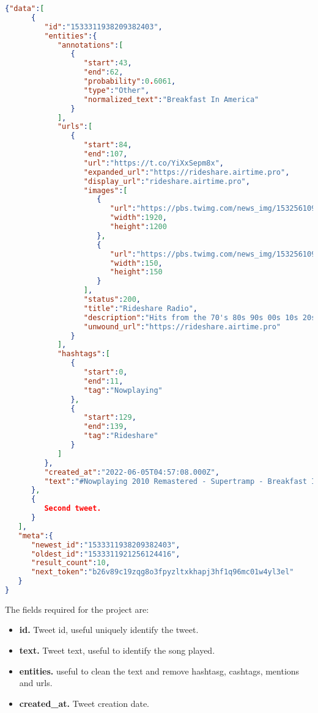 \begin{lstlisting}[language=json,firstnumber=1]
{"data":[
      {
         "id":"1533311938209382403",
         "entities":{
            "annotations":[
               {
                  "start":43,
                  "end":62,
                  "probability":0.6061,
                  "type":"Other",
                  "normalized_text":"Breakfast In America"
               }
            ],
            "urls":[
               {
                  "start":84,
                  "end":107,
                  "url":"https://t.co/YiXxSepm8x",
                  "expanded_url":"https://rideshare.airtime.pro",
                  "display_url":"rideshare.airtime.pro",
                  "images":[
                     {
                        "url":"https://pbs.twimg.com/news_img/1532561096858640397/3mUiSDDN?format=jpg&name=orig",
                        "width":1920,
                        "height":1200
                     },
                     {
                        "url":"https://pbs.twimg.com/news_img/1532561096858640397/3mUiSDDN?format=jpg&name=150x150",
                        "width":150,
                        "height":150
                     }
                  ],
                  "status":200,
                  "title":"Rideshare Radio",
                  "description":"Hits from the 70's 80s 90s 00s 10s 20s, No Talking just back to back Music totally commercials free 24/7",
                  "unwound_url":"https://rideshare.airtime.pro"
               }
            ],
            "hashtags":[
               {
                  "start":0,
                  "end":11,
                  "tag":"Nowplaying"
               },
               {
                  "start":129,
                  "end":139,
                  "tag":"Rideshare"
               }
            ]
         },
         "created_at":"2022-06-05T04:57:08.000Z",
         "text":"#Nowplaying 2010 Remastered - Supertramp - Breakfast In America  - Stream here-&gt; https://t.co/YiXxSepm8x - Non Stop Hits 24/7 #Rideshare #Radio #Hits #Uber #RideshareRadio #Petrol #Parcoursup #PlatinumJubilee #ENGvNZ #PrideMonth"
      },
      {
         Second tweet.      
      }
   ],
   "meta":{
      "newest_id":"1533311938209382403",
      "oldest_id":"1533311921256124416",
      "result_count":10,
      "next_token":"b26v89c19zqg8o3fpyzltxkhapj3hf1q96mc01w4yl3el"
   }
}
\end{lstlisting}

\nonzeroparskip The fields required for the project are:
\begin{itemize}
	\item \textbf{id.} Tweet id, useful uniquely identify the tweet.
	\item \textbf{text.} Tweet text, useful to identify the song played.
	\item \textbf{entities.} useful to clean the text and remove hashtasg, cashtags, mentions and urls.
	\item \textbf{created\_at.} Tweet creation date.
\end{itemize}

